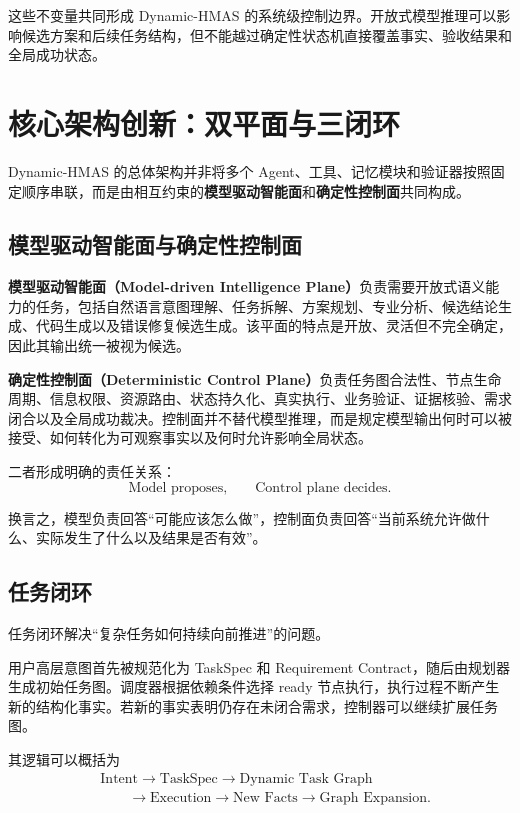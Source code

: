 \documentclass[UTF8,a4paper,12pt,oneside]{ctexbook}
\begin{document}
这些不变量共同形成 Dynamic-HMAS 的系统级控制边界。开放式模型推理可以影响候选方案和后续任务结构，但不能越过确定性状态机直接覆盖事实、验收结果和全局成功状态。


\section{核心架构创新：双平面与三闭环}

Dynamic-HMAS 的总体架构并非将多个 Agent、工具、记忆模块和验证器按照固定顺序串联，而是由相互约束的\textbf{模型驱动智能面}和\textbf{确定性控制面}共同构成。

\subsection{模型驱动智能面与确定性控制面}

\textbf{模型驱动智能面（Model-driven Intelligence Plane）}负责需要开放式语义能力的任务，包括自然语言意图理解、任务拆解、方案规划、专业分析、候选结论生成、代码生成以及错误修复候选生成。该平面的特点是开放、灵活但不完全确定，因此其输出统一被视为候选。

\textbf{确定性控制面（Deterministic Control Plane）}负责任务图合法性、节点生命周期、信息权限、资源路由、状态持久化、真实执行、业务验证、证据核验、需求闭合以及全局成功裁决。控制面并不替代模型推理，而是规定模型输出何时可以被接受、如何转化为可观察事实以及何时允许影响全局状态。

二者形成明确的责任关系：
\[
\text{Model proposes,}
\qquad
\text{Control plane decides.}
\]

换言之，模型负责回答“可能应该怎么做”，控制面负责回答“当前系统允许做什么、实际发生了什么以及结果是否有效”。

\subsection{任务闭环}

任务闭环解决“复杂任务如何持续向前推进”的问题。

用户高层意图首先被规范化为 TaskSpec 和 Requirement Contract，随后由规划器生成初始任务图。调度器根据依赖条件选择 ready 节点执行，执行过程不断产生新的结构化事实。若新的事实表明仍存在未闭合需求，控制器可以继续扩展任务图。

其逻辑可以概括为
\[
\begin{aligned}
&\text{Intent}
\rightarrow \text{TaskSpec}
\rightarrow \text{Dynamic Task Graph} \\[3pt]
&\qquad\rightarrow \text{Execution}
\rightarrow \text{New Facts}
\rightarrow \text{Graph Expansion}.
\end{aligned}
\]
\end{document}
